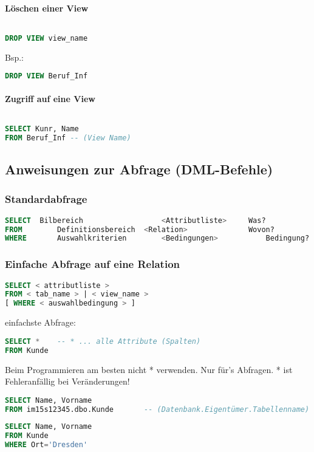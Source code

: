 \paragraph{Löschen einer View} $ $
\begin{lstlisting}[language=SQL]
DROP VIEW view_name
\end{lstlisting}
Bsp.:
\begin{lstlisting}[language=SQL]
DROP VIEW Beruf_Inf
\end{lstlisting}
\paragraph{Zugriff auf eine View} $ $
\begin{lstlisting}[language=SQL]
SELECT Kunr, Name
FROM Beruf_Inf -- (View Name)
\end{lstlisting}

\subsection{Anweisungen zur Abfrage (DML-Befehle)}
\subsubsection{Standardabfrage}
\begin{lstlisting}[language=SQL]
SELECT	Bilbereich					<Attributliste>		Was?
FROM		Definitionsbereich	<Relation>				Wovon?
WHERE		Auswahlkriterien		<Bedingungen>			Bedingung?
\end{lstlisting}
\subsubsection{Einfache Abfrage auf eine Relation}
\begin{lstlisting}[language=SQL]
SELECT < attributliste >
FROM < tab_name > | < view_name >
[ WHERE < auswahlbedingung > ]
\end{lstlisting}
einfachste Abfrage:
\begin{lstlisting}[language=SQL]
SELECT *	-- * ... alle Attribute (Spalten)
FROM Kunde
\end{lstlisting}
Beim Programmieren am besten nicht * verwenden. Nur für's Abfragen. * ist Fehleranfällig bei Veränderungen!
\begin{lstlisting}[language=SQL]
SELECT Name, Vorname
FROM im15s12345.dbo.Kunde 		-- (Datenbank.Eigentümer.Tabellenname)
\end{lstlisting}
\begin{lstlisting}[language=SQL]
SELECT Name, Vorname
FROM Kunde
WHERE Ort='Dresden'
\end{lstlisting}

